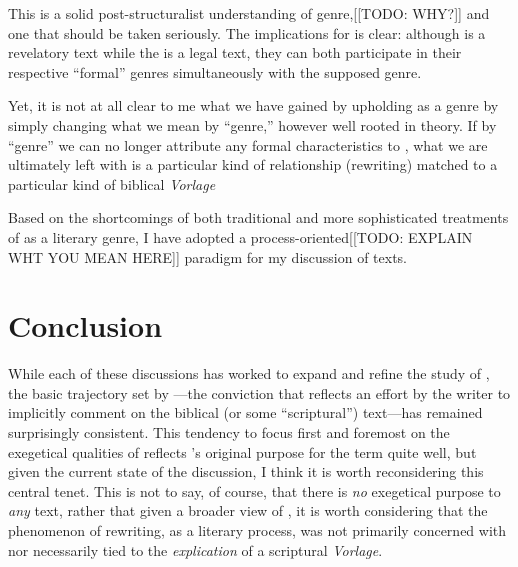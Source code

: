 This is a solid post-structuralist understanding of genre,[[TODO: WHY?]] and one that should be taken seriously. The implications for \rwb is clear: although \jub is a revelatory text while the \templescroll is a legal text, they can both participate in their respective ``formal'' genres simultaneously with the supposed \rwb genre.\autocites[Zahn also explores the ``functional'' aspects of genre. She notes that genres are ``not simply systems of classifications developed and used by literary critics, but are fundamental to all human communication.''][280]{zahn_jbl2012}[Thus, genres manifest as common patterns recognized by both the author and the reader which aid communication and in this way, genre functions as a sort of ``literary body language.''][276]{zahn_jbl2012}[See also][199: TODO: ADD FOWLER]{newsom_grossman2010} 

Yet, it is not at all clear to me what we have gained by upholding \rwb as a genre by simply changing what we mean by ``genre,'' however well rooted in theory.\autocite[Machiela critiques Zahn's approach for similar reasons. See][]{machiela_jjs2010} If by ``genre'' we can no longer attribute any formal characteristics to \rwb, what we are ultimately left with is a particular kind of relationship (rewriting) matched to a particular kind of biblical \emph{Vorlage} 

Based on the shortcomings of both traditional and more sophisticated treatments of \rwb as a literary genre, I have adopted a process-oriented[[TODO: EXPLAIN WHT YOU MEAN HERE]] paradigm for my discussion of \rwb texts.\autocite[I am in broad agreement with Campbell's treatment of the matter. See][64--67]{campbell_zsengeller2014} 


\section{Conclusion}

While each of these discussions has worked to expand and refine the study of \rwb, the basic trajectory set by \vermes---the conviction that \rwb reflects an effort by the writer to implicitly comment on the biblical (or some ``scriptural'') text---has remained surprisingly consistent. This tendency to focus first and foremost on the exegetical qualities of \rwb reflects \vermes's original purpose for the term quite well, but given the current state of the discussion, I think it is worth reconsidering this central tenet. This is not to say, of course, that there is \emph{no} exegetical purpose to \emph{any} \rwb text, rather that given a broader view of \rwb, it is worth considering that the phenomenon of rewriting, as a literary process, was not primarily concerned with nor necessarily tied to the \emph{explication} of a scriptural \emph{Vorlage}. 


